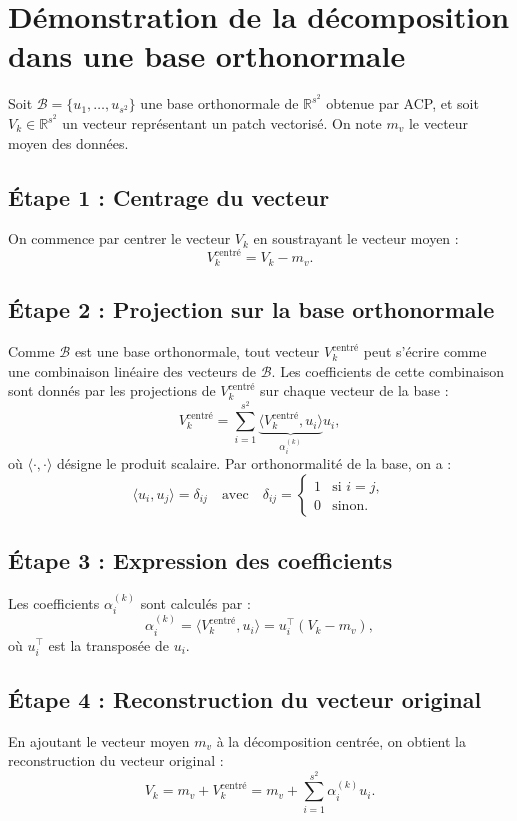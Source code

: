 \documentclass{article}
\begin{document}
\section*{Démonstration de la décomposition dans une base orthonormale}

Soit $\mathcal{B} = \{u_1, \ldots, u_{s^2}\}$ une base orthonormale de $\mathbb{R}^{s^2}$ obtenue par ACP, et soit $V_k \in \mathbb{R}^{s^2}$ un vecteur représentant un patch vectorisé. On note $m_v$ le vecteur moyen des données.

\subsection*{Étape 1 : Centrage du vecteur}
On commence par centrer le vecteur $V_k$ en soustrayant le vecteur moyen :
\[
V_k^{\text{centré}} = V_k - m_v.
\]

\subsection*{Étape 2 : Projection sur la base orthonormale}
Comme $\mathcal{B}$ est une base orthonormale, tout vecteur $V_k^{\text{centré}}$ peut s'écrire comme une combinaison linéaire des vecteurs de $\mathcal{B}$. Les coefficients de cette combinaison sont donnés par les projections de $V_k^{\text{centré}}$ sur chaque vecteur de la base :
\[
V_k^{\text{centré}} = \sum_{i=1}^{s^2} \underbrace{\langle V_k^{\text{centré}}, u_i \rangle}_{\alpha_i^{(k)}} u_i,
\]
où $\langle \cdot, \cdot \rangle$ désigne le produit scalaire. Par orthonormalité de la base, on a :
\[
\langle u_i, u_j \rangle = \delta_{ij} \quad \text{avec} \quad \delta_{ij} = 
\begin{cases}
1 & \text{si } i = j, \\
0 & \text{sinon}.
\end{cases}
\]

\subsection*{Étape 3 : Expression des coefficients}
Les coefficients $\alpha_i^{(k)}$ sont calculés par :
\[
\alpha_i^{(k)} = \langle V_k^{\text{centré}}, u_i \rangle = u_i^\top (V_k - m_v),
\]
où $u_i^\top$ est la transposée de $u_i$.

\subsection*{Étape 4 : Reconstruction du vecteur original}
En ajoutant le vecteur moyen $m_v$ à la décomposition centrée, on obtient la reconstruction du vecteur original :
\[
V_k = m_v + V_k^{\text{centré}} = m_v + \sum_{i=1}^{s^2} \alpha_i^{(k)} u_i.
\]
\end{document}
